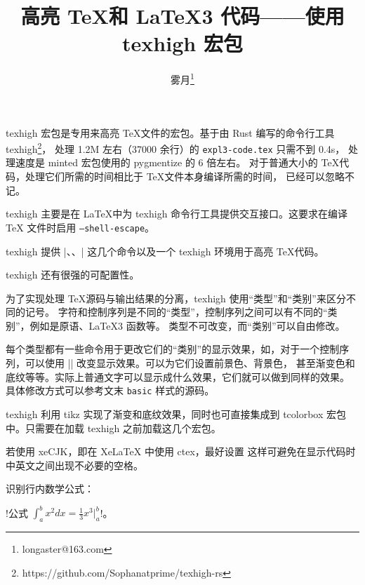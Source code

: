 \documentclass[zihao=-4]{ctexart}
\begin{document}
\title{高亮 \TeX 和 \LaTeX3 代码——使用\textsf{texhigh} 宏包}
\author{雾月\thanks{longaster@163.com}}
\maketitle

\textsf{texhigh} 宏包是专用来高亮 \TeX 文件的宏包。基于由 Rust 编写的命令行工具
texhigh\footnote{https://github.com/Sophanatprime/texhigh-rs}，
处理 1.2M 左右（37000 余行）的 \texttt{expl3-code.tex} 只需不到 0.4s，
处理速度是 \textsf{minted} 宏包使用的 pygmentize 的 6 倍左右。
对于普通大小的 \TeX 代码，处理它们所需的时间相比于 \TeX 文件本身编译所需的时间，
已经可以忽略不记。

\textsf{texhigh} 主要是在 \LaTeX 中为 texhigh 命令行工具提供交互接口。这要求在编译 \TeX
文件时启用 \texttt{--shell-escape}。

\textsf{texhigh} 提供 
\texhighverb|\texhighverb、\texhighfile、\texhighinput|
这几个命令以及一个 \textsf{texhigh} 环境用于高亮 \TeX 代码。

\textsf{texhigh} 还有很强的可配置性。

为了实现处理 \TeX 源码与输出结果的分离，\textsf{texhigh} 使用“类型”和“类别”来区分不同的记号。
字符和控制序列是不同的“类型”，控制序列之间可以有不同的“类别”，例如是原语、\LaTeX3 函数等。
类型不可改变，而“类别”可以自由修改。

每个类型都有一些命令用于更改它们的“类别”的显示效果，如，对于一个控制序列，可以使用
\texhighverb|\THSetClassCS| 改变显示效果。可以为它们设置前景色、背景色，
甚至渐变色和底纹等等。实际上普通文字可以显示成什么效果，它们就可以做到同样的效果。
具体修改方式可以参考文末 \texttt{basic} 样式的源码。

\textsf{texhigh} 利用 \textsf{tikz} 实现了渐变和底纹效果，同时也可直接集成到
\textsf{tcolorbox} 宏包中。只需要在加载 \textsf{texhigh} 之前加载这几个宏包。
\begin{examcode}{}
\usepackage{tikz}
\usepackage{tcolorbox}
\usepackage{texhigh}
若使用 xeCJK，即在 XeLaTeX 中使用 ctex，最好设置
这样可避免在显示代码时中英文之间出现不必要的空格。
\end{examcode}

识别行内数学公式：
\begin{examcode}{}
\texhighverb!公式 $ \int_a^b x^2 dx = \frac{1}{3} x^3 |_a^b $!。
\end{examcode}
\end{document}
